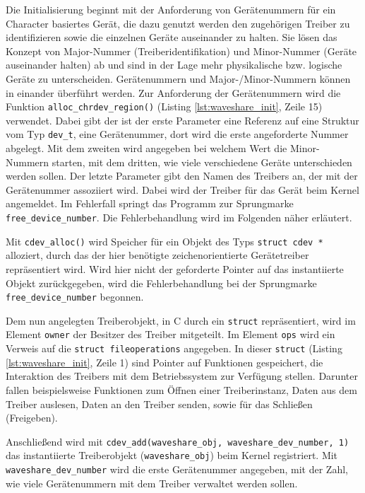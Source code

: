 Die Initialisierung beginnt mit der Anforderung von Gerätenummern für ein Character basiertes Gerät, die dazu genutzt werden den zugehörigen Treiber zu identifizieren sowie die einzelnen Geräte auseinander zu halten. Sie lösen das Konzept von Major-Nummer (Treiberidentifikation) und Minor-Nummer (Geräte auseinander halten) ab und sind in der Lage mehr physikalische bzw. logische Geräte zu unterscheiden. Gerätenummern und Major-/Minor-Nummern können in einander überführt werden. Zur Anforderung der Gerätenummern wird die Funktion \texttt{alloc_chrdev_region()} (Listing \ref{lst:waveshare_init}, Zeile 15) verwendet. Dabei gibt der ist der erste Parameter eine Referenz auf eine Struktur vom Typ \texttt{dev\_t}, eine Gerätenummer, dort wird die erste angeforderte Nummer abgelegt. Mit dem zweiten wird angegeben bei welchem Wert die Minor-Nummern starten, mit dem dritten, wie viele verschiedene Geräte unterschieden werden sollen. Der letzte Parameter gibt den Namen des Treibers an, der mit der Gerätenummer assoziiert wird. Dabei wird der Treiber für das Gerät beim Kernel angemeldet. Im Fehlerfall springt das Programm zur Sprungmarke \texttt{free_device_number}. Die Fehlerbehandlung wird im Folgenden näher erläutert.

Mit \texttt{cdev_alloc()} wird Speicher für ein Objekt des Typs \texttt{struct cdev *} alloziert, durch das der hier benötigte zeichenorientierte Gerätetreiber repräsentiert wird. Wird hier nicht der geforderte Pointer auf das instantiierte Objekt zurückgegeben, wird die Fehlerbehandlung bei der Sprungmarke \texttt{free_device_number} begonnen. 

Dem nun angelegten Treiberobjekt, in C durch ein \texttt{struct} repräsentiert, wird im Element \texttt{owner} der Besitzer des Treiber mitgeteilt. Im Element \texttt{ops} wird ein Verweis auf die \texttt{struct fileoperations} angegeben. In dieser \texttt{struct} (Listing \ref{lst:waveshare_init}, Zeile 1) sind Pointer auf Funktionen gespeichert, die Interaktion des Treibers mit dem Betriebssystem zur Verfügung stellen. Darunter fallen beispielsweise Funktionen zum Öffnen einer Treiberinstanz, Daten aus dem Treiber auslesen, Daten an den Treiber senden, sowie für das Schließen (Freigeben).  

Anschließend wird mit \texttt{cdev_add(waveshare_obj, waveshare_dev_number, 1)} das instantiierte Treiberobjekt (\texttt{waveshare\_obj}) beim Kernel registriert. Mit \\
\texttt{waveshare\_dev\_number} wird die erste Gerätenummer angegeben, mit der Zahl, wie viele Gerätenummern mit dem Treiber verwaltet werden sollen. 


